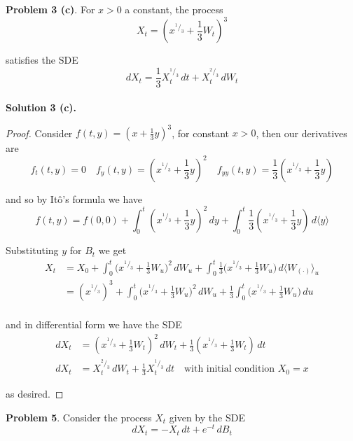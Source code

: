 \documentclass[12pt]{article}
\begin{document}
{\bf Problem 3 (c)}. 
For $x > 0$ a constant, the process
\begin{equation*}
	X_t = (x^{^1/_3} + \frac{1}{3}W_t)^3
\end{equation*}

satisfies the SDE
\begin{equation*}
	dX_t = \frac{1}{3}X_t^{^1/_3}\,dt + X_t^{^2/_3}\,dW_t
\end{equation*} \\

{\bf Solution 3 (c).}
\begin{proof} Consider $f(t,y) = (x + \frac{1}{3}y)^3$, for constant $x > 0$, then our derivatives are
\begin{equation*}
	f_t(t,y) = 	0 \quad f_{y}(t,y) = (x^{^1/_3} + \frac{1}{3}y)^2 \quad f_{yy}(t,y) = \frac{1}{3}(x^{^1/_3} + \frac{1}{3}y)
\end{equation*}
	
and so by It\^{o}'s formula we have
\begin{equation*}
	f(t,y) = f(0,0) + \int^t_0 (x^{^1/_3} + \frac{1}{3}y)^2\,dy + \int^t_0 \frac{1}{3}(x^{^1/_3} + \frac{1}{3}y)\,d\langle y\rangle
\end{equation*}
	
Substituting $y$ for $B_t$ we get
\begin{align*}
	X_t &= X_0 + \int^t_0 \big(x^{^1/_3} + \frac{1}{3}W_u\big)^2\,dW_u + \int^t_0 \frac{1}{3}\big(x^{^1/_3} + \frac{1}{3}W_u\big)\,d\langle W_{(\cdot)}\rangle_u \\
	&= (x^{^1/_3})^3 + \int^t_0 \big(x^{^1/_3} + \frac{1}{3}W_u\big)^2\,dW_u + \frac{1}{3}\int^t_0 \big( x^{^1/_3} + \frac{1}{3}W_u\big) \,du \\
\end{align*}

and in differential form we have the SDE
\begin{align*}
	dX_t &= (x^{^1/_3} + \frac{1}{3}W_t)^2\,dW_t + \frac{1}{3}(x^{^1/_3} + \frac{1}{3}W_t)\,dt \\
	dX_t &= X_t^{^2/_3}\,dW_t + \frac{1}{3}X_t^{^1/_3}\,dt \quad \text{with initial condition } X_0 = x
\end{align*}
	
as desired.
\end{proof}
\hfill\newline

{\bf Problem 5}. Consider the process $X_t$ given by the SDE
\begin{equation*}
	dX_t = -X_t\,dt + e^{-t}\,dB_t
\end{equation*}
\end{document}
